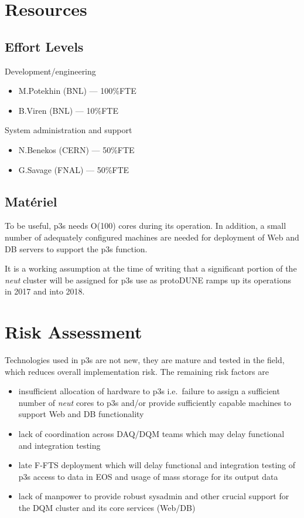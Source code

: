 \documentclass[pdftex,12pt,letter]{article}
\newcommand{\pd}{protoDUNE\xspace}
\begin{document}
\section{Resources}

\subsection{Effort Levels}

Development/engineering
\begin{itemize}
\item M.Potekhin (BNL) --- 100\%FTE
\item B.Viren (BNL) --- 10\%FTE
\end{itemize}

\noindent System administration and support

\begin{itemize}
\item N.Benekos (CERN) --- 50\%FTE
\item G.Savage (FNAL) --- 50\%FTE
\end{itemize}

\subsection{Mat\'eriel}
To be useful, p3s needs O(100) cores during its operation. In addition,
a small number of adequately configured machines are needed for
deployment of Web and DB servers to support the p3s function.

It is a working assumption at the time of writing that a significant portion of
the \textit{neut} cluster \cite{neut} will be assigned for p3s use as \pd ramps up
its operations in 2017 and into 2018.


\section{Risk Assessment}

Technologies used in p3s are not new, they are mature and tested in the field, which reduces
overall implementation risk. The remaining risk factors are
\begin{itemize}

\item insufficient allocation of hardware to p3s i.e.~failure to assign a sufficient number
of \textit{neut} cores to p3s and/or provide sufficiently capable machines to support Web
and DB functionality

\item lack of coordination across DAQ/DQM teams which may delay functional and integration
testing

\item late F-FTS deployment which will delay functional and integration testing of p3s access
to data in EOS and usage of mass storage for its output data

\item lack of manpower to provide robust sysadmin and other crucial support for the DQM
cluster and its core services (Web/DB)

\end{itemize}
\end{document}
